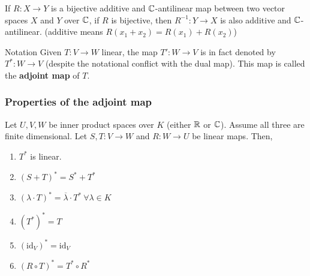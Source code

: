 \documentclass[12pt]{article}
\begin{document}
\begin{exercise}{}{}
    If $R: X \rightarrow Y$ is a bijective additive and $\mathbb{C}$-antilinear map between two vector spaces $X$ and $Y$ over $\mathbb{C}$, if $R$ is bijective, then $R^{-1}: Y \rightarrow X$ is also additive and $\mathbb{C}$-antilinear. (additive means $R(x_1 + x_2) = R(x_1) + R(x_2)$)
\end{exercise}

\begin{notebox}{Notation}{}
    Given $T: V \rightarrow W$ linear, the map $T': W \rightarrow V$ is in fact denoted by $T^*: W \rightarrow V$ (despite the notational conflict with the dual map). This map is called the \textbf{adjoint map} of $T$.
\end{notebox}

\subsubsection{Properties of the adjoint map}

\begin{lemma}{}{}
    Let $U, V, W$ be inner product spaces over $K$ (either $\mathbb{R}$ or $\mathbb{C}$). Assume all three are finite dimensional. Let $S, T: V \rightarrow W$ and $R: W \rightarrow U$ be linear maps. Then,
    \begin{enumerate}
        \item $T^*$ is linear.
        \item $(S + T)^* = S^* + T^*$
        \item $(\lambda \cdot T)^* = \overline{\lambda} \cdot T^* \ \forall \lambda \in K$
        \item $(T^*)^* = T$
        \item $(\mathrm{id}_V)^* = \mathrm{id}_V$
        \item $(R \circ T)^* = T^* \circ R^*$
    \end{enumerate}
\end{lemma}
\end{document}
